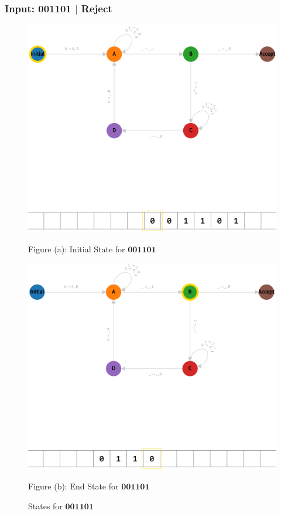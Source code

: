 \vspace*{\fill}
\newpage
\vspace*{\fill}

\subsubsection*{Input: 001101 $|$ Reject}
\label{q1-001101}

\begin{figure}[ht]
  \centering
  \begin{minipage}{.49\linewidth}
    \centering
    \includegraphics[width=\linewidth]{answers/img/q1-001101-initial.png}
    \caption*{Figure (a): Initial State for $\mathbf{001101}$}
    \label{fig:001101-initial}
  \end{minipage}
  \begin{minipage}{.49\linewidth}
    \centering
    \includegraphics[width=\linewidth]{answers/img/q1-001101-end.png}
    \caption*{Figure (b): End State for $\mathbf{001101}$}
    \label{fig:001101-end}
  \end{minipage}
  \caption{States for $\mathbf{001101}$}
  \label{fig:in-001101}
\end{figure}


